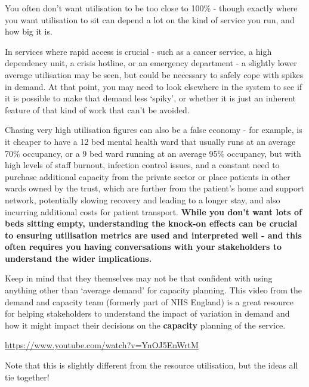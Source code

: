 \documentclass[
  letterpaper,
  DIV=11,
  numbers=noendperiod]{scrreprt}
\begin{document}
\begin{tcolorbox}[enhanced jigsaw, rightrule=.15mm, colback=white, colframe=quarto-callout-tip-color-frame, colbacktitle=quarto-callout-tip-color!10!white, toprule=.15mm, coltitle=black, opacityback=0, titlerule=0mm, bottomtitle=1mm, breakable, title=\textcolor{quarto-callout-tip-color}{\faLightbulb}\hspace{0.5em}{Tip}, opacitybacktitle=0.6, toptitle=1mm, arc=.35mm, bottomrule=.15mm, leftrule=.75mm, left=2mm]

You often don't want utilisation to be too close to 100\% - though
exactly where you want utilisation to sit can depend a lot on the kind
of service you run, and how big it is.

In services where rapid access is crucial - such as a cancer service, a
high dependency unit, a crisis hotline, or an emergency department - a
slightly lower average utilisation may be seen, but could be necessary
to safely cope with spikes in demand. At that point, you may need to
look elsewhere in the system to see if it is possible to make that
demand less `spiky', or whether it is just an inherent feature of that
kind of work that can't be avoided.

Chasing very high utilisation figures can also be a false economy - for
example, is it cheaper to have a 12 bed mental health ward that usually
runs at an average 70\% occupancy, or a 9 bed ward running at an average
95\% occupancy, but with high levels of staff burnout, infection control
issues, and a constant need to purchase additional capacity from the
private sector or place patients in other wards owned by the trust,
which are further from the patient's home and support network,
potentially slowing recovery and leading to a longer stay, and also
incurring additional costs for patient transport. \textbf{While you
don't want lots of beds sitting empty, understanding the knock-on
effects can be crucial to ensuring utilisation metrics are used and
interpreted well - and this often requires you having conversations with
your stakeholders to understand the wider implications.}

Keep in mind that they themselves may not be that confident with using
anything other than `average demand' for capacity planning. This video
from the demand and capacity team (formerly part of NHS England) is a
great resource for helping stakeholders to understand the impact of
variation in demand and how it might impact their decisions on the
\textbf{capacity} planning of the service.

\url{https://www.youtube.com/watch?v=YnOJ5EnWrtM}

Note that this is slightly different from the resource utilisation, but
the ideas all tie together!

\end{tcolorbox}
\end{document}
